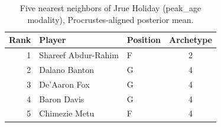 \begin{table}[htbp]
  \centering\small
  \begin{tabular}{rllc}
    \toprule
    Rank & Player & Position & Archetype \\
    \midrule
    1 & Shareef Abdur-Rahim & F & 2 \\
    2 & Dalano Banton & G & 4 \\
    3 & De'Aaron Fox & G & 4 \\
    4 & Baron Davis & G & 4 \\
    5 & Chimezie Metu & F & 4 \\
    \bottomrule
  \end{tabular}
  \caption{Five nearest neighbors of Jrue Holiday (peak_age modality), Procrustes-aligned posterior mean.}
  \label{tab:Jrue_Holiday_neighbors_peak_age}
\end{table}


